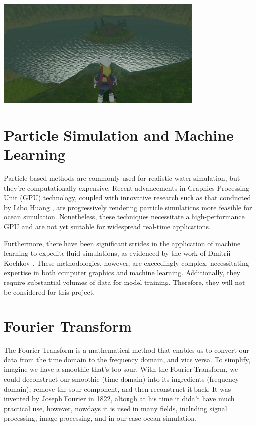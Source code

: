 \begin{minipage}{1\textwidth}
    \centering
    \includegraphics[width=0.75\textwidth]{"images/pokemon_water_tiling.png"}
    \label{fig:pokemon_water_tiling}
\end{minipage}

\section{Particle Simulation and Machine Learning}
Particle-based methods are commonly used for realistic water simulation, but they’re computationally expensive.
Recent advancements in Graphics Processing Unit (GPU) technology, coupled with innovative research such as that conducted by Libo Huang \cite{huang2021}, are progressively rendering particle simulations more feasible for ocean simulation. Nonetheless, these techniques necessitate a high-performance GPU and are not yet suitable for widespread real-time applications.

Furthermore, there have been significant strides in the application of machine learning to expedite fluid simulations, as evidenced by the work of Dmitrii Kochkov \cite{kochkov2021machine}. These methodologies, however, are exceedingly complex, necessitating expertise in both computer graphics and machine learning. Additionally, they require substantial volumes of data for model training.
Therefore, they will not be considered for this project.

\section{Fourier Transform}
The Fourier Transform is a mathematical method that enables us to convert our data from the time domain to the frequency domain, and vice versa. To simplify, imagine we have a smoothie that’s too sour. With the Fourier Transform, we could deconstruct our smoothie (time domain) into its ingredients (frequency domain), remove the sour component, and then reconstruct it back.
It was invented by Joseph Fourier\cite{fourier1822} in 1822, altough at his time it didn't have much practical use, however, nowdays it is used in many fields, including signal processing, image processing, and in our case ocean simulation.

